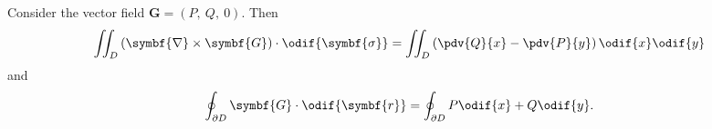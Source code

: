 \documentclass{article}
\begin{document}
\begin{corollary}
    Consider the vector field \(\symbf{G} = \left( P,\: Q,\: 0 \right)\).
    Then
    \begin{equation*}
        \iint_D \left( \symbf{\nabla} \times \symbf{G} \right) \cdot \odif{\symbf{\sigma}} = \iint_D \left( \pdv{Q}{x} - \pdv{P}{y} \right) \odif{x} \odif{y}
    \end{equation*}
    and
    \begin{equation*}
        \oint_{\partial D} \symbf{G} \cdot \odif{\symbf{r}} = \oint_{\partial D} P \odif{x} + Q \odif{y}.
    \end{equation*}
\end{corollary}
\end{document}
